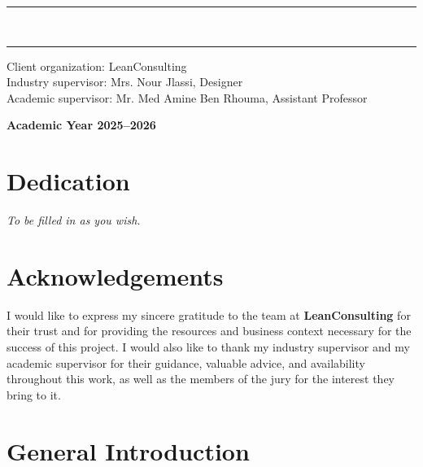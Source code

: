 \documentclass[a4paper,12pt]{report}
\begin{document}
\begin{titlepage}
\begin{center}
\vspace{0.6cm}

{\color{primaryblue}\rule{\textwidth}{2pt}}\\
{\color{primaryblue}\rule{\textwidth}{6pt}}

\vspace{1.2cm}

\end{center}

\begin{flushleft}
Client organization: \hfill LeanConsulting\\[0.3cm]
Industry supervisor: \hfill Mrs. Nour Jlassi, Designer\\[0.3cm]
Academic supervisor: \hfill Mr. Med Amine Ben Rhouma, Assistant Professor
\end{flushleft}

\vfill

\begin{center}
{\large\textbf{Academic Year 2025--2026}}
\end{center}

\end{titlepage}


\chapter*{Dedication}
\emph{To be filled in as you wish.}

\chapter*{Acknowledgements}
I would like to express my sincere gratitude to the team at
\textbf{LeanConsulting} for their trust and for providing the resources and
business context necessary for the success of this project. I would also
like to thank my industry supervisor and my academic supervisor for their
guidance, valuable advice, and availability throughout this work, as well
as the members of the jury for the interest they bring to it.

\tableofcontents
\listoffigures
\listoftables

\chapter*{General Introduction}
\end{document}
